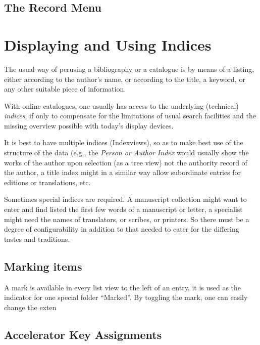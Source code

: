 \subsection{The Record Menu}
\label{sec:guimnrecord}



\section{Displaying and Using Indices}
\label{sec:guiindex}


The usual way of perusing a bibliography or a catalogue is by means of
a listing, either according to the author's name, or according to the
title, a keyword, or any other suitable piece of information. 

With online catalogues, one usually has access to the underlying
(technical) \textit{indices}, if only to compensate for the
limitations of usual search facilities and the missing overview
possible with today's display devices. 

It is best to have multiple indices (Indexviews), so as to make best
use of the structure of the data (e.g., the \textit{Person or Author
  Index} would usually show the works of the author upon selection (as
a tree view) not the authority record of the author, a title index
might in a similar way allow subordinate entries for editions or
translations, etc. 

Sometimes special indices are required. A manuscript collection might
want to enter and find listed the first few words of a manuscript or
letter, a specialist might need the names of translators, or scribes,
or printers. So there must be a degree of configurability in addition
to that needed to cater for the differing tastes and traditions.

\subsection{Marking items}
\label{sec:marking}

A mark is available in every list view to the left of an entry, it is
used as the indicator for one special folder ``Marked''. 
By toggling the mark, one can easily change the exten



\subsection{Accelerator Key Assignments}
\label{sec:keys}


